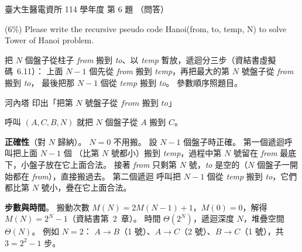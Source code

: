 \begin{pastexam}[label={px:ntu-114-bmei-ca-04}]{臺大生醫電資所 114 學年度 第 6 題}
（問答）

(6\%) Please write the recursive pseudo code Hanoi(from, to, temp, N) to solve Tower of Hanoi problem.
\end{pastexam}

\begin{pastsoln}
把 $N$ 個盤子從柱子 \textit{from} 搬到 \textit{to}、以 \textit{temp} 暫放，遞迴分三步（資結書虛擬碼~6.11）：
上面 $N - 1$ 個先從 \textit{from} 搬到 \textit{temp}，再把最大的第 $N$ 號盤子從 \textit{from} 搬到 \textit{to}，
最後把那 $N - 1$ 個從 \textit{temp} 搬到 \textit{to}。 參數順序照題目。
\begin{pseudo}[unbreakable]{河內塔}
        \State \Return {}
    \EndIf
    \State {}
    \State 印出「把第 $N$ 號盤子從 $\mathit{from}$ 搬到 $\mathit{to}$」
    \State {}
\EndProcedure
\end{pseudo}
呼叫 $(A, C, B, N)$ 就把 $N$ 個盤子從 $A$ 搬到 $C$。

\textbf{正確性}（對 $N$ 歸納）。 $N = 0$ 不用搬。 設 $N - 1$ 個盤子時正確。 第一個遞迴呼叫把上面 $N - 1$ 個
（比第 $N$ 號都小）搬到 \textit{temp}，過程中第 $N$ 號留在 \textit{from} 最底下，小盤子放在它上面合法。 接著
\textit{from} 只剩第 $N$ 號，\textit{to} 是空的（$N$ 個盤子一開始都在 \textit{from}），直接搬過去。 第二個遞迴
呼叫把 $N - 1$ 個從 \textit{temp} 搬到 \textit{to}，它們都比第 $N$ 號小，疊在它上面合法。

\textbf{步數與時間}。 搬動次數 $M(N) = 2M(N - 1) + 1$，$M(0) = 0$，解得 $M(N) = 2^N - 1$（資結書第~2~章）。
時間 $\Theta(2^N)$，遞迴深度 $N$，堆疊空間 $\Theta(N)$。 例如 $N = 2$：
$A \to B$（1 號）、$A \to C$（2 號）、$B \to C$（1 號），共 $3 = 2^2 - 1$ 步。
\end{pastsoln}
